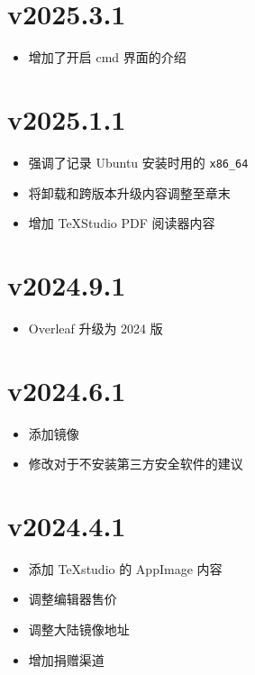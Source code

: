 \section*{v2025.3.1}

\begin{itemize}
  \item 增加了开启 \textsf{cmd} 界面的介绍
\end{itemize}

\section*{v2025.1.1}

\begin{itemize}
  \item 强调了记录 Ubuntu 安装时用的 \texttt{x86\_64}
  \item 将卸载和跨版本升级内容调整至章末
  \item 增加 \TeX Studio PDF 阅读器内容
\end{itemize}

\section*{v2024.9.1}

\begin{itemize}
  \item Overleaf 升级为 2024 版
\end{itemize}

\section*{v2024.6.1}

\begin{itemize}
  \item 添加镜像
  \item 修改对于不安装第三方安全软件的建议
\end{itemize}

\section*{v2024.4.1}

\begin{itemize}
  \item 添加 \TeX studio 的 AppImage 内容
  \item 调整编辑器售价
  \item 调整大陆镜像地址
  \item 增加捐赠渠道
\end{itemize}

